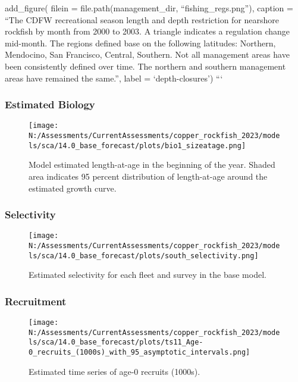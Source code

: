 \documentclass[11pt,
  english,
  letterpaper,
]{article}
\begin{document}
add\_figure( filein = file.path(management\_dir, ``fishing\_regs.png''), caption = ``The CDFW recreational season length and depth restriction for nearshore rockfish by month from 2000 to 2003. A triangle indicates a regulation change mid-month. The regions defined base on the following latitudes: Northern, Mendocino, San Francisco, Central, Southern. Not all management areas have been consistently defined over time. The northern and southern management areas have remained the same.'', label = `depth-closures') ```

\pagebreak

\hypertarget{estimated-biology}{%
\subsubsection{Estimated Biology}\label{estimated-biology}}

\begin{figure}
\centering
\texttt{[image: N:/Assessments/CurrentAssessments/copper\_rockfish\_2023/models/sca/14.0\_base\_forecast/plots/bio1\_sizeatage.png]}
\caption{Model estimated length-at-age in the beginning of the year. Shaded area indicates 95 percent distribution of length-at-age around the estimated growth curve.\label{fig:mod-est-len-age}}
\end{figure}

\pagebreak

\hypertarget{selectivity}{%
\subsubsection{Selectivity}\label{selectivity}}

\begin{figure}
\centering
\texttt{[image: N:/Assessments/CurrentAssessments/copper\_rockfish\_2023/models/sca/14.0\_base\_forecast/plots/south\_selectivity.png]}
\caption{Estimated selectivity for each fleet and survey in the base model.\label{fig:est-selex}}
\end{figure}

\newpage

\hypertarget{recruitment-1}{%
\subsubsection{Recruitment}\label{recruitment-1}}

\begin{figure}
\centering
\texttt{[image: N:/Assessments/CurrentAssessments/copper\_rockfish\_2023/models/sca/14.0\_base\_forecast/plots/ts11\_Age-0\_recruits\_(1000s)\_with\_95\_asymptotic\_intervals.png]}
\caption{Estimated time series of age-0 recruits (1000s).\label{fig:recruits}}
\end{figure}
\end{document}
